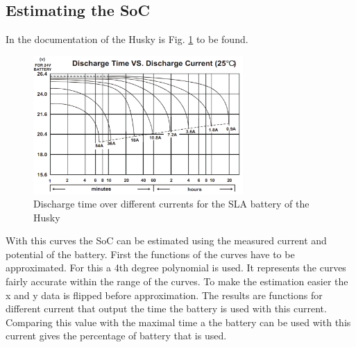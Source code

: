 \documentclass[conference]{IEEEtran}
\begin{document}
\subsection{Estimating the SoC}
In the documentation of the Husky is Fig. \ref{fig:EndladekuvenSLA} to be found.
\begin{figure}[htbp]
    \centerline{\includegraphics[width=8cm]{Pictures/EndladekuvenSLA.png}}
    \caption{Discharge time over different currents for the SLA battery of the Husky \cite[p.21]{SLAKurven}}
    \label{fig:EndladekuvenSLA}
\end{figure}
With this curves the SoC can be estimated using the measured current and potential of the battery.
First the functions of the curves have to be approximated. For this a 4th degree polynomial is used.
It represents the curves fairly accurate within the range of the curves.
To make the estimation easier the x and y data is flipped before approximation.
The results are functions for different current that output the time the battery is used with this current.
Comparing this value with the maximal time a the battery can be used with this current gives the percentage of battery that is used.
\end{document}
